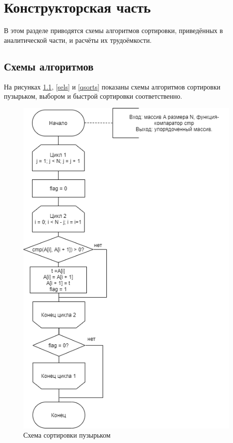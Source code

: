 \documentclass[12pt]{report}
\begin{document}
\newpage

\chapter{Конструкторская часть}

В этом разделе приводятся схемы алгоритмов сортировки, приведённых в аналитической части, и расчёты их трудоёмкости. 

\section{Схемы алгоритмов}

На рисунках \ref{bubs}, \ref{sels} и \ref{qsorts} показаны схемы алгоритмов сортировки пузырьком, выбором и быстрой сортировки соответственно.

\begin{figure}[H]
	\raggedleft
	\includegraphics[scale = 0.53]{bsort.png}
	\caption{Схема сортировки пузырьком}
	\label{bubs}
\end{figure}
\end{document}
